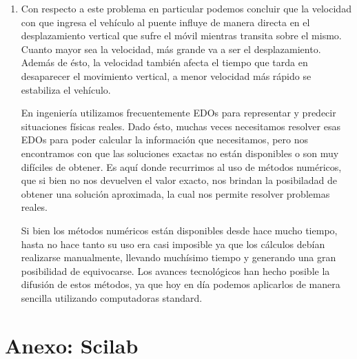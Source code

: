 \documentclass[10.5pt]{article}
\begin{document}
\begin{enumerate}
 \item Con respecto a este problema en particular podemos concluir que la velocidad con que ingresa el vehículo al puente influye de
 manera directa en el desplazamiento vertical que sufre el móvil mientras transita sobre el mismo. Cuanto mayor sea la velocidad, más grande
 va a ser el desplazamiento. Además de ésto, la velocidad también afecta el tiempo que tarda en desaparecer el movimiento vertical, a menor
 velocidad más rápido se estabiliza el vehículo.
 
 En ingeniería utilizamos frecuentemente EDOs para representar y predecir situaciones físicas reales. Dado ésto, muchas veces necesitamos
 resolver esas EDOs para poder calcular la información que necesitamos, pero nos encontramos con que las soluciones exactas no están disponibles
 o son muy difíciles de obtener. Es aquí donde recurrimos al uso de métodos numéricos, que si bien no nos devuelven el valor exacto, nos brindan
 la posibiladad de obtener una solución aproximada, la cual nos permite resolver problemas reales.
 
 Si bien los métodos numéricos están disponibles desde hace mucho tiempo, hasta no hace tanto su uso era casi imposible ya que los cálculos debían
 realizarse manualmente, llevando muchísimo tiempo y generando una gran posibilidad de equivocarse. Los avances tecnológicos han hecho posible la
 difusión de estos métodos, ya que hoy en día podemos aplicarlos de manera sencilla utilizando computadoras standard. 
 \end{enumerate}

\newpage
\section*{Anexo: Scilab}


\end{document}
